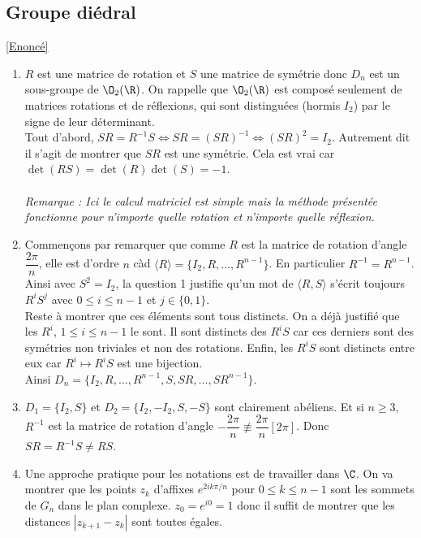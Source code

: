\documentclass[8pt]{book}
\begin{document}
	\subsection{Groupe diédral }
	\label{Groupe diédral corrigé}
	\textcolor{blue}{\hyperref[Groupe diédral]{[Enoncé]}}
	\begin{enumerate}[leftmargin=*]
		\item $R$ est une matrice de rotation et $S$ une matrice de symétrie donc $D_n$ est un sous-groupe de $\O_2(\R)$. On rappelle que $\O_2(\R)$ est composé seulement de matrices rotations et de réflexions, qui sont distinguées (hormis $I_2$) par le signe de leur déterminant.\\
		Tout d'abord, $SR=R^{-1}S\iff SR=(SR)^{-1}\iff (SR)^2=I_2$. Autrement dit il s'agit de montrer que $SR$ est une symétrie. Cela est vrai car $\det(RS)=\det(R)\det(S)=-1$.\\\\
		\textit{Remarque : Ici le calcul matriciel est simple mais la méthode présentée fonctionne pour n'importe quelle rotation et n'importe quelle réflexion.}
		\item Commençons par remarquer que comme $R$ est la matrice de rotation d'angle $\dfrac{2\pi}{n}$, elle est d'ordre $n$ càd $\langle R\rangle=\{I_2,R,\dots,R^{n-1}\}$. En particulier $R^{-1}=R^{n-1}$. Ainsi avec $S^2=I_2$, la question 1 justifie qu'un mot de $\langle R,S\rangle$ s'écrit toujours $R^iS^j$ avec $0\leq i\leq n-1$ et $j\in \{0,1\}$.\\
		Reste à montrer que ces éléments sont tous distincts. On a déjà justifié que les $R^i$, $1\leq i\leq n-1$ le sont. Il sont distincts des $R^iS$ car ces derniers sont des symétries non triviales et non des rotations. Enfin, les $R^iS$ sont distincts entre eux car $R^i\mapsto R^iS$ est une bijection.\\
		Ainsi $D_n=\{I_2,R,\dots,R^{n-1},S,SR,\dots,SR^{n-1}\}$.
		\item $D_1=\{I_2,S\}$ et $D_2=\{I_2,-I_2,S,-S\}$ sont clairement abéliens. Et si $n\geq 3$, $R^{-1}$ est la matrice de rotation d'angle $-\dfrac{2\pi}{n}\not\equiv\dfrac{2\pi}{n}[2\pi]$. Donc $SR=R^{-1}S\ne RS$.
		\item Une approche pratique pour les notations est de travailler dans $\C$. On va montrer que les points $z_k$ d'affixes $e^{2ik\pi/n}$ pour $0\leq k\leq n-1$ sont les sommets de $G_n$ dans le plan complexe. $z_0=e^{i0}=1$ donc il suffit de montrer que les distances $|z_{k+1}-z_k|$ sont toutes égales.\\

\end{enumerate}
\end{document}
